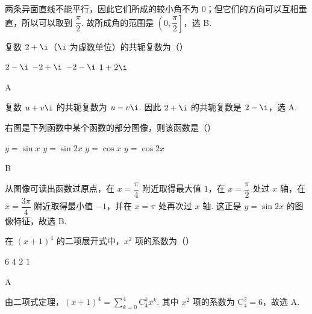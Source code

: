 \begin{solution}
两条异面直线不能平行，因此它们所成的较小角不为 \(0\)；但它们的方向可以互相垂直，所以可以取到 \(\dfrac{\pi}{2}\). 故所成角的范围是 \(\left(0,\dfrac{\pi}{2}\right]\)，选 B.
\end{solution}

\begin{problem}
复数 \(2+\i\)（\(\i\) 为虚数单位）的共轭复数为（\quad）

\choices
    {\(2-\i\)}
    {\(-2+\i\)}
    {\(-2-\i\)}
    {\(1+2\i\)}
\end{problem}

\begin{answer}
A
\end{answer}

\begin{solution}
复数 \(u+v\i\) 的共轭复数为 \(u-v\i\). 因此 \(2+\i\) 的共轭复数是 \(2-\i\)，选 A.
\end{solution}

\begin{problem}
右图是下列函数中某个函数的部分图像，则该函数是（\quad）


\choices
    {\( y = \sin x \)}
    {\( y = \sin 2x \)}
    {\( y = \cos x \)}
    {\( y = \cos 2x \)}
\end{problem}

\begin{answer}
B
\end{answer}

\begin{solution}
从图像可读出函数过原点，在 \(x=\dfrac{\pi}{4}\) 附近取得最大值 \(1\)，在 \(x=\dfrac{\pi}{2}\) 处过 \(x\) 轴，在 \(x=\dfrac{3\pi}{4}\) 附近取得最小值 \(-1\)，并在 \(x=\pi\) 处再次过 \(x\) 轴. 这正是 \(y=\sin2x\) 的图像特征，故选 B.
\end{solution}

\begin{problem}
在 \( (x+1)^{4} \) 的二项展开式中，\( x^{2} \) 项的系数为（\quad）

\choices
    {\(6\)}
    {\(4\)}
    {\(2\)}
    {\(1\)}
\end{problem}

\begin{answer}
A
\end{answer}

\begin{solution}
由二项式定理，\((x+1)^4=\sum_{k=0}^{4}\mathrm C_4^k x^k\). 其中 \(x^2\) 项的系数为 \(\mathrm C_4^2=6\)，故选 A.
\end{solution}


